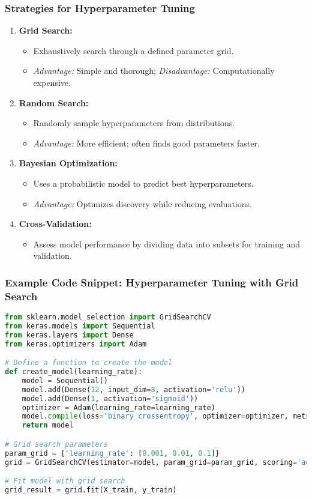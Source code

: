 \documentclass[aspectratio=169]{beamer}
\begin{document}
\begin{frame}
    \frametitle{Strategies for Hyperparameter Tuning}
    \begin{enumerate}
        \item \textbf{Grid Search:}
            \begin{itemize}
                \item Exhaustively search through a defined parameter grid.
                \item \textit{Advantage:} Simple and thorough; \textit{Disadvantage:} Computationally expensive.
            \end{itemize}
        \item \textbf{Random Search:}
            \begin{itemize}
                \item Randomly sample hyperparameters from distributions.
                \item \textit{Advantage:} More efficient; often finds good parameters faster.
            \end{itemize}
        \item \textbf{Bayesian Optimization:}
            \begin{itemize}
                \item Uses a probabilistic model to predict best hyperparameters.
                \item \textit{Advantage:} Optimizes discovery while reducing evaluations.
            \end{itemize}
        \item \textbf{Cross-Validation:}
            \begin{itemize}
                \item Assess model performance by dividing data into subsets for training and validation.
            \end{itemize}
    \end{enumerate}
\end{frame}

\begin{frame}[fragile]
    \frametitle{Example Code Snippet: Hyperparameter Tuning with Grid Search}
    \begin{lstlisting}[language=Python]
from sklearn.model_selection import GridSearchCV
from keras.models import Sequential
from keras.layers import Dense
from keras.optimizers import Adam

# Define a function to create the model
def create_model(learning_rate):
    model = Sequential()
    model.add(Dense(12, input_dim=8, activation='relu'))
    model.add(Dense(1, activation='sigmoid'))
    optimizer = Adam(learning_rate=learning_rate)
    model.compile(loss='binary_crossentropy', optimizer=optimizer, metrics=['accuracy'])
    return model

# Grid search parameters
param_grid = {'learning_rate': [0.001, 0.01, 0.1]}
grid = GridSearchCV(estimator=model, param_grid=param_grid, scoring='accuracy', n_jobs=-1)

# Fit model with grid search
grid_result = grid.fit(X_train, y_train)
    \end{lstlisting}
\end{frame}
\end{document}
